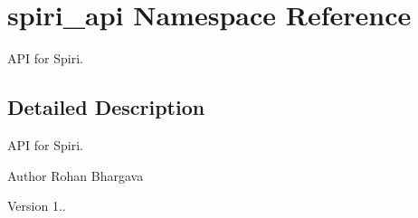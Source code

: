 \hypertarget{namespacespiri__api}{\section{spiri\-\_\-api \-Namespace \-Reference}
\label{namespacespiri__api}
}


\-A\-P\-I for \-Spiri.  




\subsection{\-Detailed \-Description}
\-A\-P\-I for \-Spiri. \begin{DoxyAuthor}{\-Author}
\-Rohan \-Bhargava 
\end{DoxyAuthor}
\begin{DoxyVersion}{\-Version}
1.. 
\end{DoxyVersion}
